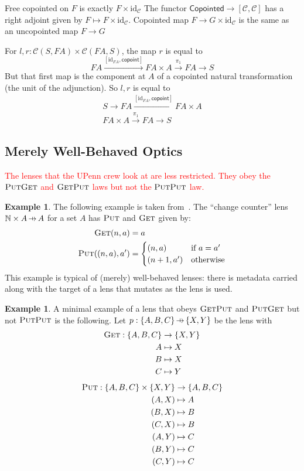 \documentclass[11pt,a4paper]{article}
\theoremstyle{plain}
\theoremstyle{definition}
\newtheorem{example}[theorem]{Example}
\newcommand{\C}{\mathscr{C}}
\newcommand{\bN}{\mathbb{N}}
\newcommand{\id}{\mathrm{id}}
\newcommand{\fget}{\textsc{Get}}
\newcommand{\fput}{\textsc{Put}}
\newcommand{\hto}{\ensuremath{\,\mathaccent\shortmid\rightarrow\,}}
\newcommand{\todo}[1]{\textcolor{red}{\small #1}}
\begin{document}
Free copointed on $F$ is exactly $F \times \id_\C$
The functor $\mathsf{Copointed} \to [\C, \C]$ has a right adjoint given by $F \mapsto F \times \id_\C$. Copointed map $F \to G \times \id_\C$ is the same as an uncopointed map $F \to G$

For $l, r : \C(S, FA) \times \C(FA, S)$, the map $r$ is equal to
\[
  FA \xrightarrow{[\id_{FA}, \mathsf{copoint}]} FA \times A \xrightarrow{\pi_1} FA \to S
\]
But that first map is the component at $A$ of a copointed natural transformation (the unit of the adjunction). So $l, r$ is equal to
\begin{align*}
  S \to FA \xrightarrow{[\id_{FA}, \mathsf{copoint}]} FA \times A\\
  FA \times A \xrightarrow{\pi_1} FA \to S
\end{align*}

\subsection{Merely Well-Behaved Optics}
\todo{
  The lenses that the UPenn crew look at are less restricted. They obey the $\fput\fget$ and $\fget\fput$ laws but not the $\fput\fput$ law.
}

\begin{example}
  The following example is taken from~\cite{AClearPictureOfLensLaws}. The ``change counter'' lens $\bN \times A \hto A$ for a set $A$ has $\fput$ and $\fget$ given by:
  \begin{align*}
    \fget(n, a) &= a \\
    \fput((n, a), a') &= \begin{cases}
      (n, a) & \text{if } a = a' \\
      (n+1, a') & \text{otherwise}
    \end{cases}
  \end{align*}
  This example is typical of (merely) well-behaved lenses: there is metadata carried along with the target of a lens that mutates as the lens is used.
\end{example}

\begin{example}
  A minimal example of a lens that obeys $\fget\fput$ and $\fput\fget$ but not $\fput\fput$ is the following. Let $p : \{A,B,C\} \hto \{X, Y\}$ be the lens with
  \begin{align*}
    \fget : \{A,B,C\} &\to \{X, Y\} \\
    A &\mapsto X \\
    B &\mapsto X \\
    C &\mapsto Y
  \end{align*}
  \begin{align*}
    \fput : \{A,B,C\} \times \{X, Y\} &\to \{A,B,C\} \\
    (A,X) &\mapsto A \\
    (B,X) &\mapsto B \\
    (C,X) &\mapsto B \\
    (A,Y) &\mapsto C \\
    (B,Y) &\mapsto C \\
    (C,Y) &\mapsto C
  \end{align*}
\end{example}
\end{document}
